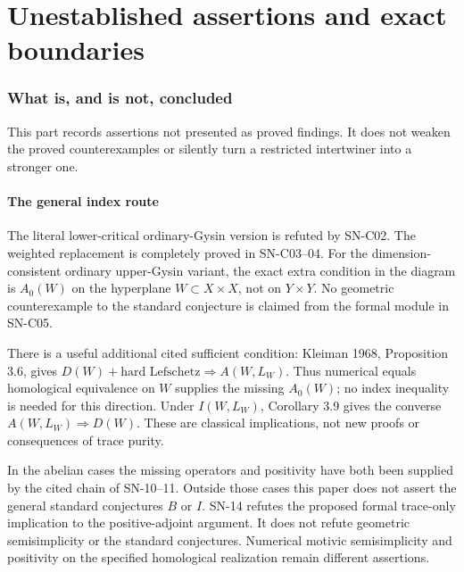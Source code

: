\part{Unestablished assertions and exact boundaries}
\section{What is, and is not, concluded}

This part records assertions not presented as proved findings. It does
not weaken the proved counterexamples or silently turn a restricted
intertwiner into a stronger one.

\subsection{The general index route}
The literal lower-critical ordinary-Gysin version is refuted by
SN-C02. The weighted replacement is completely proved in SN-C03--04.
For the dimension-consistent ordinary upper-Gysin variant, the exact
extra condition in the diagram is $A_0(W)$ on the hyperplane
$W\subset X\times X$, not on $Y\times Y$. No geometric
counterexample to the standard conjecture is claimed from the
formal module in SN-C05.

There is a useful additional cited sufficient condition:
Kleiman 1968, Proposition 3.6, gives
$D(W)+\text{hard Lefschetz}\Rightarrow A(W,L_W)$.
Thus numerical equals homological equivalence on $W$ supplies
the missing $A_0(W)$; no index inequality is needed for this
direction. Under $I(W,L_W)$, Corollary 3.9 gives the converse
$A(W,L_W)\Rightarrow D(W)$. These are classical implications,
not new proofs or consequences of trace purity.

In the abelian cases the missing operators and positivity have
both been supplied by the cited chain of SN-10--11. Outside
those cases this paper does not assert the general standard
conjectures $B$ or $I$. SN-14 refutes the proposed formal
trace-only implication to the positive-adjoint argument. It
does not refute geometric semisimplicity or the standard conjectures.
Numerical motivic semisimplicity and positivity on the specified
homological realization remain different assertions.

